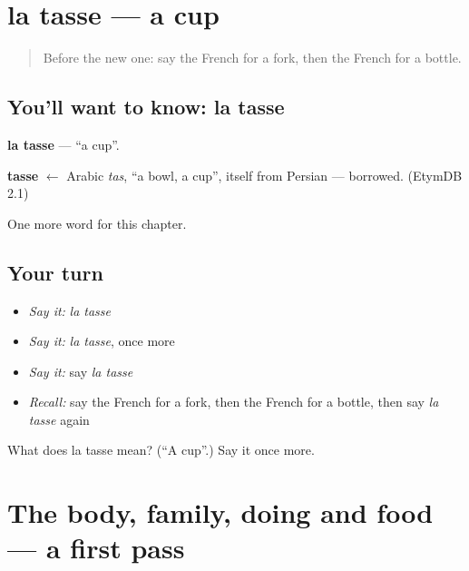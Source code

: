 \section[la tasse]{la tasse — a cup}

\label{lesson:FR-C77-tasse}



\begin{quote}
Before the new one: say the French for a fork, then the French for a bottle.
\end{quote}

\subsection*{You'll want to know: la tasse}
\textbf{la tasse} — \textquotedblleft{}a cup\textquotedblright{}.

\begin{cousinweb}
\textbf{tasse} $\leftarrow$ Arabic \emph{tas}, \textquotedblleft{}a bowl, a cup\textquotedblright{}, itself from Persian — borrowed. (EtymDB 2.1)
\end{cousinweb}

\begin{grammarlens}[title={What you've built}]
One more word for this chapter.
\end{grammarlens}

\subsection*{Your turn}
\begin{itemize}
\raggedright
  \item \emph{Say it:} \emph{la tasse}
  \item \emph{Say it:} \emph{la tasse}, once more
  \item \emph{Say it:} say \emph{la tasse}
  \item \emph{Recall:} say the French for a fork, then the French for a bottle, then say \emph{la tasse} again
\end{itemize}

\begin{tcolorbox}[breakable,colback=teal!4,colframe=teal!35!black,title={Before you move on}]
What does la tasse mean? (\textquotedblleft{}A cup\textquotedblright{}.) Say it once more.
\end{tcolorbox}
\section[(dialogue)]{The body, family, doing and food — a first pass}

